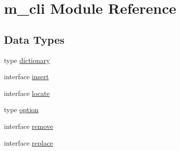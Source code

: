 \hypertarget{namespacem__cli}{}\section{m\+\_\+cli Module Reference}
\label{namespacem__cli}
\subsection*{Data Types}
\begin{DoxyCompactItemize}
\item 
type \mbox{\hyperlink{structm__cli_1_1dictionary}{dictionary}}
\item 
interface \mbox{\hyperlink{interfacem__cli_1_1insert}{insert}}
\item 
interface \mbox{\hyperlink{interfacem__cli_1_1locate}{locate}}
\item 
type \mbox{\hyperlink{structm__cli_1_1option}{option}}
\item 
interface \mbox{\hyperlink{interfacem__cli_1_1remove}{remove}}
\item 
interface \mbox{\hyperlink{interfacem__cli_1_1replace}{replace}}
\end{DoxyCompactItemize}
